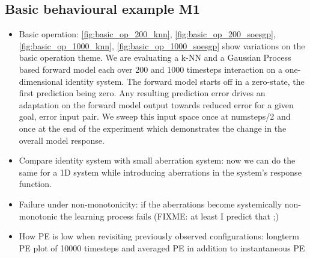 \documentclass[11pt]{llncs}
\begin{document}
\subsection{Basic behavioural example M1}
\label{sec:exprs_basic_ex_m1}

\begin{itemize}
\item Basic operation:
  \autoref{fig:basic_op_200_knn}, \autoref{fig:basic_op_200_soesgp},
  \autoref{fig:basic_op_1000_knn}, \autoref{fig:basic_op_1000_soesgp}
  show variations on the basic operation theme. We are evaluating a
  k-NN and a Gaussian Process based forward model each over 200 and
  1000 timesteps interaction on a one-dimensional identity system. The
  forward model starts off in a zero-state, the first prediction being
  zero. Any resulting prediction error drives an adaptation on the
  forward model output towards reduced error for a given goal, error
  input pair. We sweep this
  input space once at numsteps/2 and once at the end of the
  experiment which demonstrates the change in the overall model
  response.
  \item Compare identity system with small aberration system: now we
    can do the same for a 1D system while introducing aberrations in
    the system's response function.
  \item Failure under non-monotonicity: if the aberrations become
    systemically non-monotonic the learning process fails (FIXME: at least I
    predict that ;)
\item How PE is low when revisiting previously observed
  configurations: longterm PE plot of 10000 timesteps and averaged PE
  in addition to instantaneous PE
\end{itemize}
    
\end{document}
